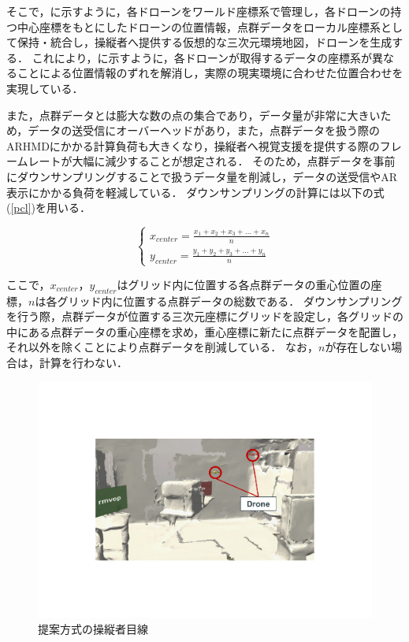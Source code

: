 \documentclass[a4paper,11pt]{ujreport}
\begin{document}
そこで，に示すように，各ドローンをワールド座標系で管理し，各ドローンの持つ中心座標をもとにしたドローンの位置情報，点群データをローカル座標系として保持・統合し，操縦者へ提供する仮想的な三次元環境地図，ドローンを生成する．
これにより，に示すように，各ドローンが取得するデータの座標系が異なることによる位置情報のずれを解消し，実際の現実環境に合わせた位置合わせを実現している．

また，点群データとは膨大な数の点の集合であり，データ量が非常に大きいため，データの送受信にオーバーヘッドがあり，また，点群データを扱う際のARHMDにかかる計算負荷も大きくなり，操縦者へ視覚支援を提供する際のフレームレートが大幅に減少することが想定される．
そのため，点群データを事前にダウンサンプリングすることで扱うデータ量を削減し，データの送受信やAR表示にかかる負荷を軽減している．
ダウンサンプリングの計算には以下の式(\ref{pcl})を用いる．

\begin{equation}
  \label{pcl}
  \left\{
    \begin{aligned}
    x_{center}=\frac{x_{1}+x_{2}+x_{3}+ \dots + x_{n}}{n}\\
    y_{center}=\frac{y_{1}+y_{2}+y_{3}+ \dots + y_{n}}{n}
  \end{aligned}
  \right.
\end{equation}

ここで，$x_{center}$，$y_{center}$はグリッド内に位置する各点群データの重心位置の座標，${n}$は各グリッド内に位置する点群データの総数である．
ダウンサンプリングを行う際，点群データが位置する三次元座標にグリッドを設定し，各グリッドの中にある点群データの重心座標を求め，重心座標に新たに点群データを配置し，それ以外を除くことにより点群データを削減している．
なお，${n}$が存在しない場合は，計算を行わない．


\begin{figure}[!tb]
  \centering
  \includegraphics[width=\linewidth]{img/03_propose.pdf}
  \caption{提案方式の操縦者目線}
  \label{fig:03_propose}
\end{figure}
\end{document}
